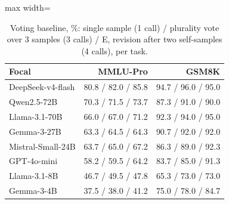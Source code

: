 \begin{table}[t]
\centering
\caption{Voting baseline, \%: single sample (1 call) / plurality vote over 3 samples (3 calls) / E, revision after two self-samples (4 calls), per task.}
\label{tab:voting}
\begin{adjustbox}{max width=\linewidth}
\small
\begin{tabular}{@{}lrr@{}}
\toprule
Focal & MMLU-Pro & GSM8K \\
\midrule
DeepSeek-v4-flash & 80.8 / 82.0 / 85.8 & 94.7 / 96.0 / 95.0 \\
Qwen2.5-72B & 70.3 / 71.5 / 73.7 & 87.3 / 91.0 / 90.0 \\
Llama-3.1-70B & 66.0 / 67.0 / 71.2 & 92.3 / 94.0 / 95.0 \\
Gemma-3-27B & 63.3 / 64.5 / 64.3 & 90.7 / 92.0 / 92.0 \\
Mistral-Small-24B & 63.7 / 65.0 / 67.2 & 86.3 / 89.0 / 92.3 \\
GPT-4o-mini & 58.2 / 59.5 / 64.2 & 83.7 / 85.0 / 91.3 \\
Llama-3.1-8B & 46.7 / 49.5 / 47.8 & 65.3 / 73.0 / 73.0 \\
Gemma-3-4B & 37.5 / 38.0 / 41.2 & 75.0 / 78.0 / 84.7 \\
\bottomrule
\end{tabular}
\end{adjustbox}
\end{table}
